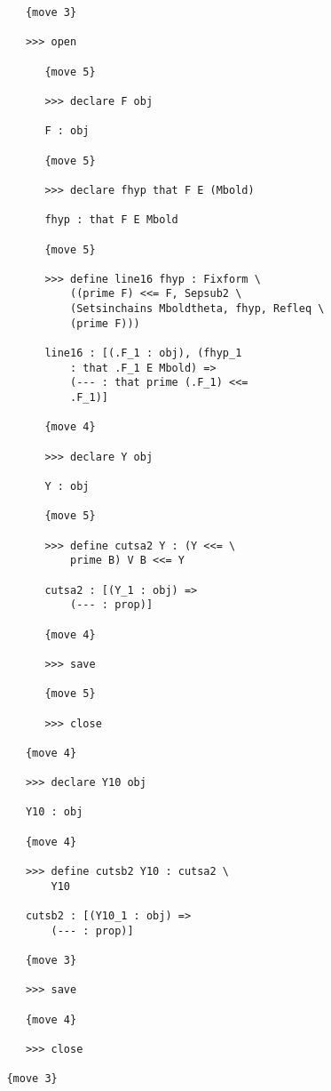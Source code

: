 \documentclass[12pt]{article}
\begin{document}
\begin{verbatim}
            {move 3}

            >>> open

               {move 5}

               >>> declare F obj

               F : obj

               {move 5}

               >>> declare fhyp that F E (Mbold)

               fhyp : that F E Mbold

               {move 5}

               >>> define line16 fhyp : Fixform \
                   ((prime F) <<= F, Sepsub2 \
                   (Setsinchains Mboldtheta, fhyp, Refleq \
                   (prime F)))

               line16 : [(.F_1 : obj), (fhyp_1 
                   : that .F_1 E Mbold) => 
                   (--- : that prime (.F_1) <<= 
                   .F_1)]

               {move 4}

               >>> declare Y obj

               Y : obj

               {move 5}

               >>> define cutsa2 Y : (Y <<= \
                   prime B) V B <<= Y

               cutsa2 : [(Y_1 : obj) => 
                   (--- : prop)]

               {move 4}

               >>> save

               {move 5}

               >>> close

            {move 4}

            >>> declare Y10 obj

            Y10 : obj

            {move 4}

            >>> define cutsb2 Y10 : cutsa2 \
                Y10

            cutsb2 : [(Y10_1 : obj) => 
                (--- : prop)]

            {move 3}

            >>> save

            {move 4}

            >>> close

         {move 3}


\end{verbatim}
\end{document}
